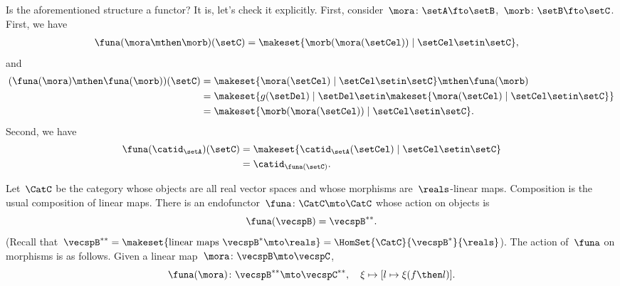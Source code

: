 \begin{example}
    Is the aforementioned structure a functor?
    It is, let's check it explicitly.
    First, consider~$\mora\colon \setA\fto \setB$,~$\morb\colon \setB \fto \setC$.
    First, we have
    \begin{equation}
        \begin{aligned}
            \funa(\mora\mthen \morb)(\setC) & =\makeset{ \morb(\mora(\setCel))\mid \setCel \setin \setC},
        \end{aligned}
    \end{equation}
    and
    \begin{equation}
        \begin{aligned}
            (\funa(\mora)\mthen \funa(\morb))(\setC)
             & =\makeset{ \mora(\setCel) \mid \setCel \setin \setC}\mthen \funa(\morb) \\
             & =\makeset{g(\setDel)\mid \setDel \setin \makeset{\mora(\setCel)\mid \setCel\setin \setC}} \\
             & =\makeset{ \morb(\mora(\setCel))\mid \setCel \setin \setC}.
        \end{aligned}
    \end{equation}
    Second, we have
    \begin{equation}
        \begin{aligned}
            \funa(\catid_\setA)(\setC) & = \makeset{\catid_\setA(\setCel)\mid \setCel \setin \setC} \\
                                       & =\catid_{\funa(\setC)}.
        \end{aligned}
    \end{equation}
\end{example}

\begin{example}
    \label{exa:double-dual-functor}
    Let~$\CatC$ be the category whose objects are all real vector spaces and whose morphisms are~$\reals$-linear maps.
    Composition is the usual composition of linear maps.
    There is an endofunctor~$\funa \colon \CatC \mto \CatC$ whose action on objects is
    \begin{equation}
        \funa ( \vecspB ) = \vecspB^{**}.
    \end{equation}
    (Recall that~$\vecspB^{**} = \makeset{ \text{linear maps } \vecspB^* \mto \reals } =  \HomSet{\CatC}{\vecspB^*}{\reals}$).
    The action of~$\funa$ on morphisms is as follows.
    Given a linear map~$\mora \colon \vecspB \mto \vecspC$,
    \begin{equation}
        \funa ( \mora ) \colon \vecspB^{**} \mto \vecspC^{**}, \quad \xi \mapsto [ l \mapsto \xi (f \then l)].
    \end{equation}
\end{example}

